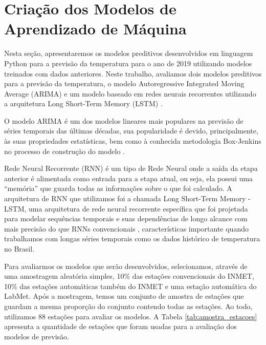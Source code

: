 \chapter{Criação dos Modelos de Aprendizado de Máquina}

Nesta seção, apresentaremos os modelos preditivos desenvolvidos em linguagem Python para a previsão da temperatura para o ano de 2019 utilizando modelos treinados com dados anteriores. Neste trabalho, avaliamos dois modelos preditivos para a previsão da temperatura, o modelo Autoregressive Integrated Moving Average (ARIMA) \cite{whittle1951hypothesis} e um modelo baseado em redes neurais recorrentes utilizando a arquitetura Long Short-Term Memory (LSTM) \cite{hochreiter1997long}.

O modelo ARIMA é um dos modelos lineares mais populares na previsão de séries temporais das últimas décadas, sua popularidade é devido, principalmente, às suas propriedades estatísticas, bem como à conhecida metodologia Box-Jenkins \cite{box2011time} no processo de construção do modelo \cite{zhang2003time}. 

Rede Neural Recorrente (RNN) é um tipo de Rede Neural onde a saída da etapa anterior é alimentada como entrada para a etapa atual, ou seja, ela possui uma “memória” que guarda todas as informações sobre o que foi calculado. A arquitetura de RNN que utilizamos foi a chamada Long Short-Term Memory - LSTM, uma arquitetura de rede neural recorrente específica que foi projetada para modelar sequências temporais e suas dependências de longo alcance com mais precisão do que RNNs convencionais \cite{sak2014long}, características importante quando trabalhamos com longas séries temporais como os dados histórico de temperatura no Brasil. 

Para avaliarmos os modelos que serão desenvolvidos, selecionamos, através de uma amostragem aleatória simples, 10\% das estações convencionais do INMET, 10\% das estações automáticas também do INMET e uma estação automática do LabMet. Após a mostragem, temos um conjunto de amostra de estações que guardam a mesma proporção do conjunto contendo todas as estações. Ao todo, utilizamos 88 estações para avaliar os modelos.  A Tabela \ref{tab:amostra_estacoes} apresenta a quantidade de estações que foram usadas para a avaliação dos modelos de previsão.  

